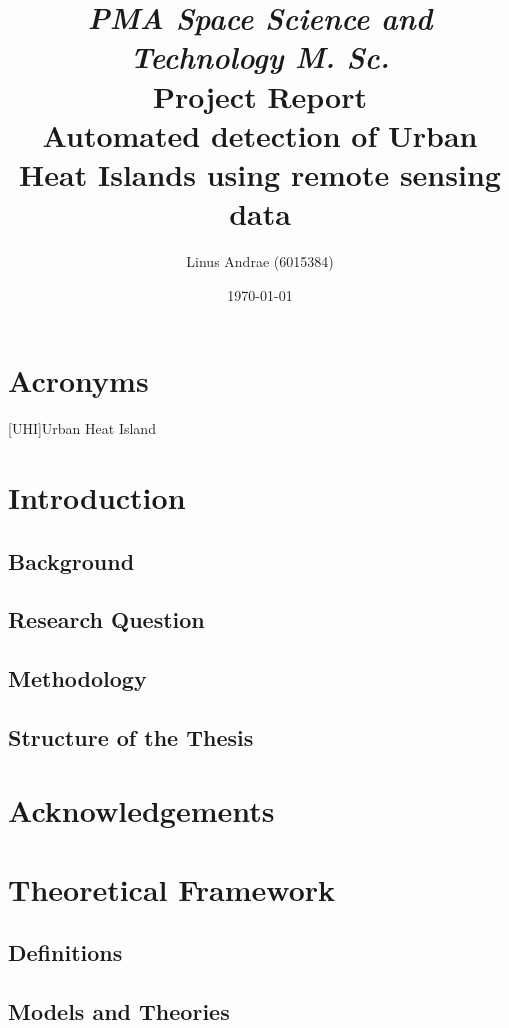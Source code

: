 \documentclass[a4paper, english]{article}
\title{\textit{PMA Space Science and Technology M. Sc.} \\ \vspace{1cm}Project Report \\ \vspace{1cm} \textbf{\huge Automated detection of Urban Heat Islands using remote sensing data}\\ \vspace{1.2cm} }
\author{Linus Andrae (6015384)}
\date{\today}
\begin{document}

\newpage

\newpage
\tableofcontents
\listoffigures
\listoftables
\section*{Acronyms}
\begin{acronym}
  [UHI]{Urban Heat Island}
\end{acronym}
\newpage

\section{Introduction}
    \subsection{Background}
   
    \subsection{Research Question}
    
    \subsection{Methodology}
    \subsection{Structure of the Thesis}

\section*{Acknowledgements}

\section{Theoretical Framework}
    \subsection{Definitions}
    
    \subsection{Models and Theories}
\end{document}
